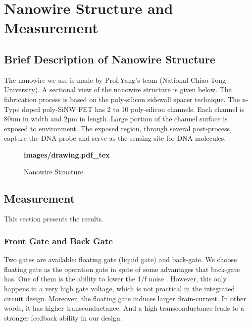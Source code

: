 \chapter{Nanowire Structure and Measurement}
\section{Brief Description of Nanowire Structure}
The nanowire we use is made by Prof.Yang's team (National Chiao Tong University)\cite{C5}.
A sectional view of the nanowire structure is given below.
The fabrication process is based on the poly-silicon sidewall spacer technique.
The n-Type doped poly-SiNW FET has 2 to 10 poly-silicon channels.
Each channel is 80nm in width and 2µm in length.
Large portion of the channel surface is exposed to environment.
The exposed region, through several post-process, capture the DNA probe and serve as the sensing site for DNA molecules.\cite{C5, C6}

\begin{figure}[!htbp]
    \centering
    {\selectfont\textbf{
        \def\svgwidth{5.0cm}
        \fontsize{6}{7}\selectfont
         {images/drawing.pdf_tex}
    }}
    \fontsize{6}{7}\selectfont
    \caption{Nanowire Structure}
    \label{fig:drawing}
\end{figure}



\section{Measurement}
This section presents the results.

\subsection*{Front Gate and Back Gate}
Two gates are available: floating gate (liquid gate) and back-gate.
We choose floating gate as the operation gate in spite of some advantages that back-gate has.
One of them is the ability to lower the 1/f noise \cite{C7, C8}.
However, this only happens in a very high gate voltage, which is not practical in the integrated circuit design.
Moreover, the floating gate induces larger drain-current.
In other words, it has higher transconductance. And a high transconductance leads to a stronger feedback ability in our design.

%


